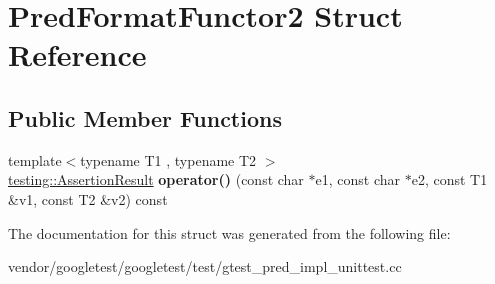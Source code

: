 \hypertarget{struct_pred_format_functor2}{}\section{Pred\+Format\+Functor2 Struct Reference}
\label{struct_pred_format_functor2}
\subsection*{Public Member Functions}
\begin{DoxyCompactItemize}
\item 
\mbox{\label{struct_pred_format_functor2_a0169e0105e15d5c63bece2a20646b22b}} 
{\footnotesize template$<$typename T1 , typename T2 $>$ }\\\mbox{\hyperlink{classtesting_1_1_assertion_result}{testing\+::\+Assertion\+Result}} {\bfseries operator()} (const char $\ast$e1, const char $\ast$e2, const T1 \&v1, const T2 \&v2) const
\end{DoxyCompactItemize}


The documentation for this struct was generated from the following file\+:\begin{DoxyCompactItemize}
\item 
vendor/googletest/googletest/test/gtest\+\_\+pred\+\_\+impl\+\_\+unittest.\+cc\end{DoxyCompactItemize}
